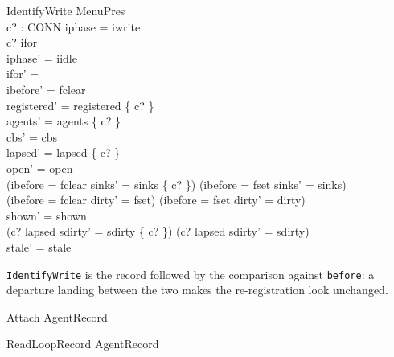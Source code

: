 \documentclass[a4paper,10pt,fleqn]{article}
\begin{document}
\begin{schema}{IdentifyWrite}
  \Delta MenuPres \\
  c? : CONN
\where
  iphase = iwrite \\
  c? \in ifor \\
  iphase' = iidle \\
  ifor' = \emptyset \\
  ibefore' = fclear \\
  registered' = registered \cup \{ c? \} \\
  agents' = agents \cup \{ c? \} \\
  cbs' = cbs \\
  lapsed' = lapsed \setminus \{ c? \} \\
  open' = open \\
  (ibefore = fclear \land sinks' = sinks \oplus \{ c?  \}) \lor
    (ibefore = fset \land sinks' = sinks) \\
  (ibefore = fclear \land dirty' = fset) \lor
    (ibefore = fset \land dirty' = dirty) \\
  shown' = shown \\
  (c? \in lapsed \land sdirty' = sdirty \cup \{ c? \}) \lor
    (c? \notin lapsed \land sdirty' = sdirty) \\
  stale' = stale
\end{schema}

\texttt{IdentifyWrite} is the record followed by the comparison against \texttt{before}: a departure landing between the two makes the re-registration look unchanged.

\begin{zed}
  Attach  AgentRecord \land [\Delta MenuPres; c? : CONN | open' = open \cup \{ c? \}]
\end{zed}

\begin{zed}
  ReadLoopRecord  AgentRecord \land
    [\Delta MenuPres; c? : CONN | open' = open \land c? \in open]
\end{zed}
\end{document}
